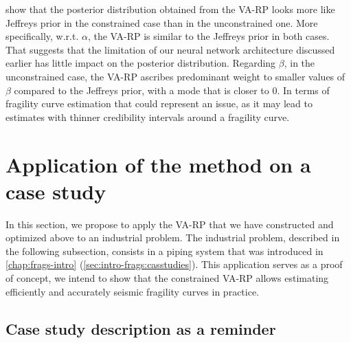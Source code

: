 show that the posterior distribution obtained from the VA-RP looks more like Jeffreys prior %
in the constrained case than in the unconstrained one. 
More specifically, w.r.t. $\alpha$, the VA-RP is similar to the Jeffreys prior in both cases. That suggests that the limitation of our neural network architecture discussed earlier has little impact on the posterior distribution.
Regarding $\beta$,
in the unconstrained case, the VA-RP ascribes predominant weight to smaller values of $\beta$ compared to the Jeffreys prior, with a mode that is closer to $0$. In terms of fragility curve estimation that could represent an issue, as it may lead to estimates with thinner credibility intervals around a fragility curve. %









\section{Application of the method on a case study}\label{sec:constr-frags:appasg}


In this section, we propose to apply the VA-RP that we have constructed and optimized above
to an industrial problem.
The industrial problem, described in the following subsection, consists in a piping system that was introduced in   \cref{chap:frags-intro} (\cref{sec:intro-frags:casstudies}). 
This application serves as a proof of concept, we intend to show that the constrained VA-RP allows estimating efficiently and accurately seismic fragility curves in practice.








\subsection{Case study description as a reminder}\label{sec:constr-frags:subsec:asgdesc}


